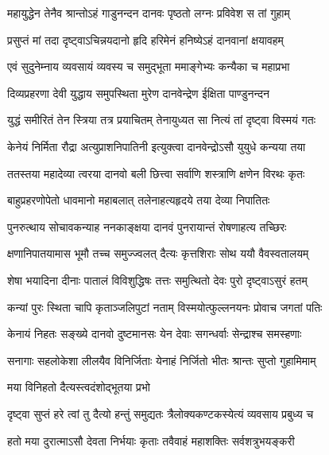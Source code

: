 \twolineshloka
{महायुद्धेन तेनैव श्रान्तोऽहं गाडुनन्दन}
{दानवः पृष्ठतो लग्नः प्रविवेश स तां गुहाम्} %

\twolineshloka
{प्रसुप्तं मां तदा दृष्ट्वाऽचिन्नयदानो हृदि}
{हरिमेनं हनिष्येऽहं दानवानां क्षयावहम्} %

\twolineshloka
{एवं सुदुनेम्नाय व्यवसायं व्यवस्य च}
{समुद्भूता ममाङ्गेभ्यः कन्यैका च महाप्रभा} %

\twolineshloka
{दिव्यप्रहरणा देवी युद्धाय समुपस्थिता}
{मुरेण दानवेन्द्रेण ईक्षिता पाण्डुनन्दन} %

\twolineshloka
{युद्धं समीरितं तेन स्त्रिया तत्र प्रयाचितम्}
{तेनायुध्यत सा नित्यं तां दृष्ट्वा विस्मयं गतः} %

\twolineshloka
{केनेयं निर्मिता रौद्रा अत्युप्राशनिपातिनी}
{इत्युक्त्वा दानवेन्द्रोऽसौ युयुधे कन्यया तया} %

\twolineshloka
{ततस्तया महादेव्या त्वरया दानवो बली}
{छित्त्वा सर्वाणि शस्त्राणि क्षणेन विरथः कृतः} %

\twolineshloka
{बाहुप्रहरणोपेतो धावमानो महाबलात्}
{तलेनाहत्यहृदये तया देव्या निपातितः} %

\twolineshloka
{पुनरुत्थाय सोचावकन्याह ननकाङ्क्षया}
{दानवं पुनरायान्तं रोषणाहत्य तच्छिरः} %

\twolineshloka
{क्षणानिपातयामास भूमौ तच्च समुज्ज्वलत्}
{दैत्यः कृत्तशिराः सोथ ययौ वैवस्वतालयम्} %

\twolineshloka
{शेषा भयादिना दीनाः पातालं विविशुद्धिषः}
{तत्तः समुत्थितो देवः पुरो दृष्ट्वाऽसुरं हतम्} %

\twolineshloka
{कन्यां पुरः स्थिता चापि कृताञ्जलिपुटां नताम्}
{विस्मयोत्फुल्लनयनः प्रोवाच जगतां पतिः} %

\twolineshloka
{केनायं निहतः सङ्ख्ये दानवो दुष्टमानसः}
{येन देवाः सगन्धर्वाः सेन्द्राश्च समस्हणाः} %

\twolineshloka
{सनागाः सहलोकेशा लीलयैव विनिर्जिताः}
{येनाहं निर्जितो भीतः श्रान्तः सुप्तो गुहामिमाम्} %



\onelineshloka
{मया विनिहतो दैत्यस्त्वदंशोद्भूतया प्रभो} %

\twolineshloka
{दृष्ट्वा सुप्तं हरे त्वां तु दैत्यो हन्तुं समुद्यतः}
{त्रैलोक्यकण्टकस्येत्यं व्यवसाय प्रबुध्य च} %

\twolineshloka
{हतो मया दुरात्माऽसौ देवता निर्भयाः कृताः}
{तवैवाहं महाशक्तिः सर्वशत्रुभयङ्करी} %

